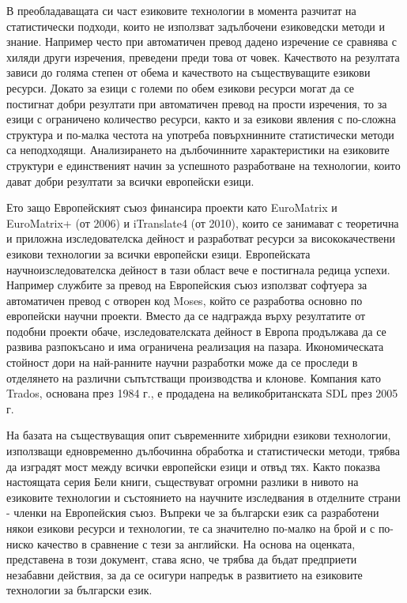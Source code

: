 \documentclass[]{../../metanetpaper}
\begin{document}
\begin{multicols}{2}
В преобладаващата си част езиковите технологии в момента разчитат на статистически подходи, които не използват задълбочени езиковедски методи и знание. Например често при автоматичен превод дадено изречение се сравнява с хиляди други изречения, преведени преди това от човек. Качеството на резултата зависи до голяма степен от обема и качеството на съществуващите езикови ресурси. Докато за езици с големи по обем езикови ресурси могат да се постигнат добри резултати при автоматичен превод на прости изречения, то за езици с ограничено количество ресурси, както и за езикови явления с по-сложна структура и по-малка честота на употреба повърхнинните статистически методи са неподходящи. Анализирането на дълбочинните характеристики на езиковите структури е единственият начин за успешното разработване на технологии, които дават добри резултати за всички европейски езици.


Ето защо Европейският съюз финансира проекти като EuroMatrix и EuroMatrix+ (от 2006) и iTranslate4 (от 2010), които се занимават с теоретична и приложна изследователска дейност и разработват ресурси за висококачествени езикови технологии за всички европейски езици. Европейската научноизследователска дейност в тази област вече е постигнала редица успехи. Например службите за превод на Европейския съюз използват софтуера за автоматичен превод с отворен код Moses, който се разработва основно по европейски научни проекти. Вместо да се надгражда върху резултатите от подобни проекти обаче, изследователската дейност в Европа  продължава да се развива разпокъсано и има ограничена реализация на пазара. Икономическата стойност дори на най-ранните научни разработки може да се проследи в отделянето на различни съпътстващи производства и клонове. Компания като Trados, основана през 1984 г., е продадена на великобританската SDL през 2005 г.


На базата на съществуващия опит съвременните хибридни езикови технологии, използващи едновременно дълбочинна обработка и статистически методи, трябва да изградят мост между всички европейски езици и отвъд тях. Както показва настоящата серия Бели книги, съществуват огромни разлики в нивото на езиковите технологии и състоянието на научните изследвания в отделните страни - членки на Европейския съюз.
Въпреки че за български език са разработени някои езикови ресурси и технологии, те са значително по-малко на брой и с по-ниско качество в сравнение с тези за английски.
На основа на оценката, представена в този документ, става ясно, че трябва да бъдат предприети незабавни действия, за да се осигури напредък в развитието на езиковите технологии за български език.


\end{multicols}
\end{document}
